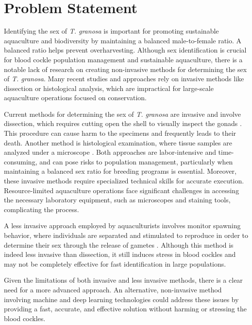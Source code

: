 \section{Problem Statement}

Identifying the sex of \textit{T. granosa} is important for promoting sustainable aquaculture and biodiversity by maintaining a balanced male-to-female ratio. A balanced ratio helps prevent overharvesting. Although sex identification is crucial for blood cockle population management and sustainable aquaculture, there is a notable lack of research on creating non-invasive methods for determining the sex of \textit{T. granosa}. Many recent studies and approaches rely on invasive methods like dissection or histological analysis, which are impractical for large-scale aquaculture operations focused on conservation.

Current methods for determining the sex of \textit{T. granosa} are invasive and  involve dissection, which requires cutting open the shell to visually inspect the gonads \cite{erica2018}. This procedure can cause harm to the specimens and frequently leads to their death. Another method is histological examination, where tissue samples are analyzed under a microscope \cite{may2021}. Both approaches are labor-intensive and time-consuming, and can pose risks to population management, particularly when maintaining a balanced sex ratio for breeding programs is essential. Moreover, these invasive methods require specialized technical skills for accurate execution. Resource-limited aquaculture operations face significant challenges in accessing the necessary laboratory equipment, such as microscopes and staining tools, complicating the process.

A less invasive approach employed by aquaculturists involves monitor spawning behavior, where individuals are separated and stimulated to reproduce in order to determine their sex through the release of gametes \cite{miranda2023}. Although this method is indeed less invasive than dissection, it still induces stress in blood cockles and may not be completely effective for fast identification in large populations.

Given the limitations of both invasive and less invasive methods, there is a clear need for a more advanced approach. An alternative, non-invasive method involving machine and deep learning technologies could address these issues by providing a fast, accurate, and effective solution without harming or stressing the blood cockles.

